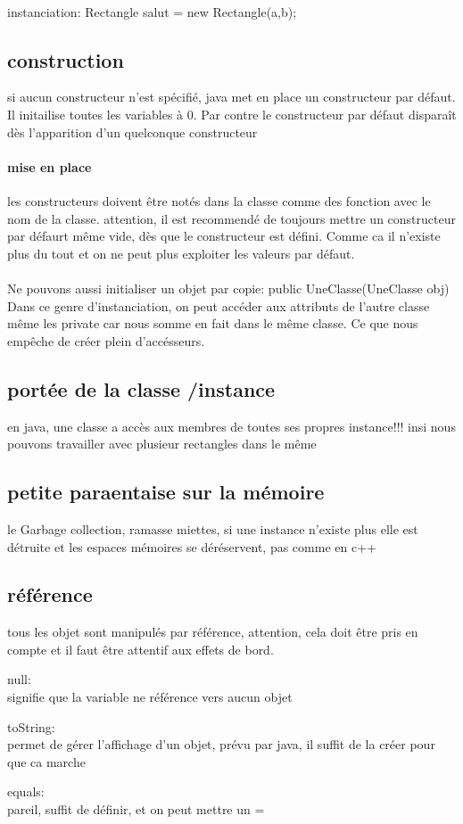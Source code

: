 \documentclass[a4paper,10pt]{article}
\begin{document}
\paragraph{}
instanciation: Rectangle salut = new Rectangle(a,b);
\subsection{construction}
si aucun constructeur n'est spécifié, java met en place un constructeur par défaut. Il initailise toutes les variables à 0. Par contre le constructeur par défaut disparaît dès l'apparition d'un quelconque constructeur
\paragraph{mise en place}
les constructeurs doivent être notés dans la classe comme des fonction avec le nom de la classe.
\newline
attention, il est recommendé de toujours mettre un constructeur par défaurt même vide, dès que le constructeur est défini. Comme ca il n'existe plus du tout et on ne peut plus exploiter les valeurs par défaut.
\paragraph{}
Ne pouvons aussi initialiser un objet par copie: public UneClasse(UneClasse obj)
\newline
Dans ce genre d'instanciation, on peut accéder aux attributs de l'autre classe même les private car nous somme en fait dans le même classe.
 Ce que nous empêche de créer plein d'accésseurs.
 \subsection{portée de la classe /instance}
 en java, une classe a accès aux membres de toutes ses propres instance!!! insi nous pouvons travailler avec plusieur rectangles dans le même
 \subsection{petite paraentaise sur la mémoire}
 le Garbage collection, ramasse miettes, si une instance n'existe plus elle est détruite et les espaces mémoires se déréservent, pas comme en c++
 \subsection{référence}
 tous les objet sont manipulés par référence, attention, cela doit être pris en compte et il faut être attentif aux effets de bord.
 \newline
 \begin{description}
  \item null:\\{signifie que la variable ne référence vers aucun objet}
  \item toString:\\{permet de gérer l'affichage d'un objet, prévu par java, il suffit de la créer pour que ca marche}
  \item equals:\\{pareil, suffit de définir, et on peut mettre un =}
 \end{description}
\end{document}
